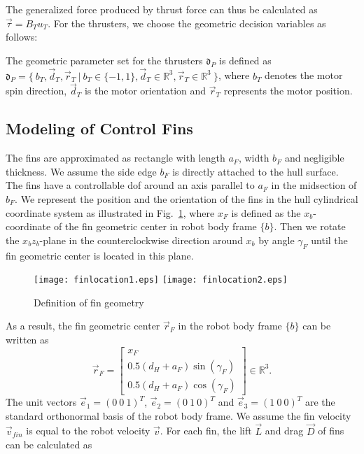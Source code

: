 The generalized force produced by thrust force can thus be calculated as $\vec{\tau}=B_{T}u_{T}$. For the thrusters, we choose the geometric decision variables as follows:
\begin{definition}
The geometric parameter set for the thrusters $\mathfrak{d}_{P}$ is defined as $\mathfrak{d}_{P}=\lbrace~b_{T}, \vec{d}_{T}, \vec{r}_{T}~|~b_{T}\in \lbrace -1, 1 \rbrace, \vec{d}_{T} \in \mathbb{R}^{3}, \vec{r}_{T} \in \mathbb{R}^{3}~\rbrace$, where $b_{T}$ denotes the motor spin direction, $\vec{d}_{T}$ is the motor orientation and $\vec{r}_{T}$ represents the motor position.
\end{definition}
\subsection{Modeling of Control Fins}
The fins are approximated as rectangle with length $a_{F}$, width $b_{F}$ and negligible thickness. We assume the side edge $b_{F}$ is directly attached to the hull surface. The fins have a controllable \ac{dof} around an axis parallel to $a_{F}$ in the midsection of $b_{F}$. We represent the position and the orientation of the fins in the hull cylindrical coordinate system as illustrated in Fig.~\ref{FIG:FinGeo}, where $x_{F}$ is defined as the $x_b$-coordinate of the fin geometric center in robot body frame $\lbrace b \rbrace$. Then we rotate the $x_{b}z_{b}$-plane in the counterclockwise direction around $x_b$ by angle $\gamma_{F}$ until the fin geometric center is located in this plane. 
\begin{figure}[thpb]
\centering
\texttt{[image: finlocation1.eps]}
\texttt{[image: finlocation2.eps]}
\caption{Definition of fin geometry}
\label{FIG:FinGeo}
\end{figure}
As a result, the fin geometric center $\vec{r}_{F}$ in the robot body frame $\lbrace b \rbrace$ can be written as
\begin{equation}
\vec{r}_{F}=
\begin{bmatrix}
x_{F}\\0.5(d_{H}+a_{F})\sin(\gamma_{F})\\0.5(d_{H}+a_{F})\cos(\gamma_{F})
\end{bmatrix} \in \mathbb{R}^{3}.
\end{equation}
The unit vectors $\vec{e}_{1}=(0~0~1)^{T}$, $\vec{e}_{2}=(0~1~0)^{T}$ and $\vec{e}_{3}=(1~0~0)^{T}$ are the standard orthonormal basis of the robot body frame. 
We assume the fin velocity $\vec{v}_{fin}$ is equal to the robot velocity $\vec{v}$. For each fin, the lift $\vec{L}$ and drag $\vec{D}$ of fins can be calculated as
